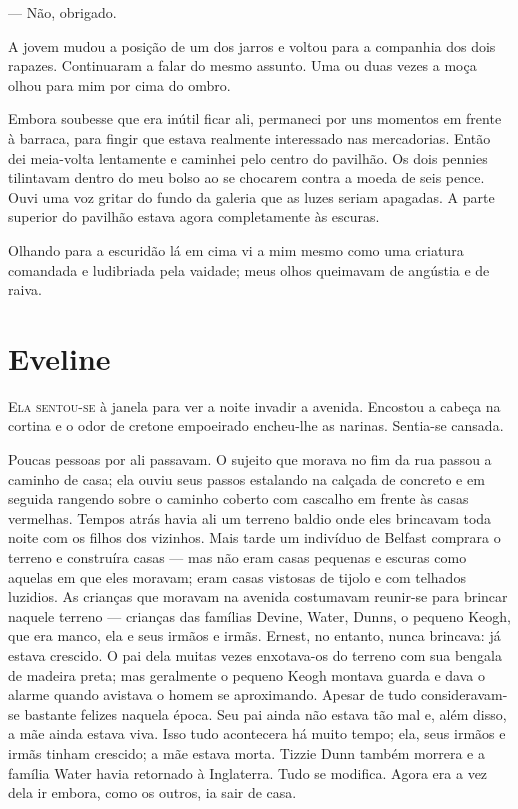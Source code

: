 --- Não, obrigado.

A jovem mudou a posição de um dos jarros e voltou para a companhia dos
dois rapazes. Continuaram a falar do mesmo assunto. Uma ou duas vezes
a moça olhou para mim por cima do ombro.

Embora soubesse que era inútil ficar ali, permaneci por uns momentos
em frente à barraca, para fingir que estava realmente interessado nas
mercadorias. Então dei meia-volta lentamente e caminhei pelo centro do
pavilhão. Os dois pennies tilintavam dentro do meu bolso ao se
chocarem contra a moeda de seis pence. Ouvi uma voz gritar do fundo da
galeria que as luzes seriam apagadas. A parte superior do pavilhão
estava agora completamente às escuras.

Olhando para a escuridão lá em cima vi a mim mesmo como uma criatura
comandada e ludibriada pela vaidade; meus olhos queimavam de angústia
e de raiva.

\chapter{Eveline}

\textsc{Ela sentou-se} à janela para ver a noite invadir a avenida. Encostou a
cabeça na cortina e o odor de cretone empoeirado encheu-lhe as
narinas. Sentia-se cansada.

Poucas pessoas por ali passavam. O sujeito que morava no fim da rua
passou a caminho de casa; ela ouviu seus passos estalando na calçada
de concreto e em seguida rangendo sobre o caminho coberto com cascalho
em frente às casas vermelhas. Tempos atrás havia ali um terreno baldio
onde eles brincavam toda noite com os filhos dos vizinhos. Mais tarde
um indivíduo de Belfast comprara o terreno e construíra casas ---
mas não eram casas pequenas e escuras como aquelas em que eles
moravam; eram casas vistosas de tijolo e com telhados luzidios. As
crianças que moravam na avenida costumavam reunir-se para brincar
naquele terreno --- crianças das famílias Devine, Water, Dunns, o
pequeno Keogh, que era manco, ela e seus irmãos e irmãs. Ernest, no
entanto, nunca brincava: já estava crescido. O pai dela muitas vezes
enxotava-os do terreno com sua bengala de madeira preta; mas
geralmente o pequeno Keogh montava guarda e dava o alarme quando
avistava o homem se aproximando. Apesar de tudo consideravam-se
bastante felizes naquela época. Seu pai ainda não estava tão mal e,
além disso, a mãe ainda estava viva. Isso tudo acontecera há muito
tempo; ela, seus irmãos e irmãs tinham crescido; a mãe estava morta.
Tizzie Dunn também morrera e a família Water havia retornado à
Inglaterra. Tudo se modifica. Agora era a vez dela ir embora, como os
outros, ia sair de casa.

